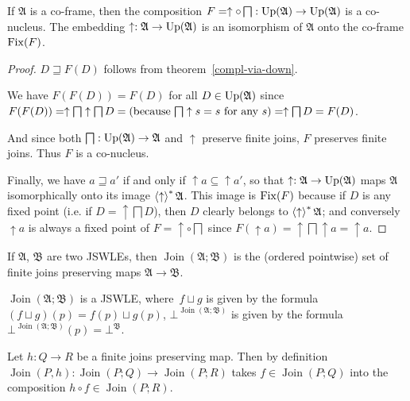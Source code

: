 \begin{cor}
\label{down-meet-co-nucleus}If $\mathfrak{A}$ is a co-frame, then
the composition $F=\uparrow\circ\bigsqcap:\operatorname{Up}(\mathfrak{A})\rightarrow\operatorname{Up}(\mathfrak{A})$
is a co-nucleus. The embedding $\uparrow:\mathfrak{A}\rightarrow\operatorname{Up}(\mathfrak{A})$
is an isomorphism of $\mathfrak{A}$ onto the co-frame $\operatorname{Fix}(F)$.\end{cor}
\begin{proof}
$D\sqsupseteq F(D)$ follows from theorem~\ref{compl-via-down}.

We have $F(F(D))=F(D)$ for all $D\in\operatorname{Up}(\mathfrak{A})$ since
$F(F(D))=\uparrow\bigsqcap\uparrow\bigsqcap D=\text{(because \ensuremath{\bigsqcap\uparrow s=s} for any \ensuremath{s})}=\uparrow\bigsqcap D=F(D)$.

And since both $\bigsqcap:\operatorname{Up}(\mathfrak{A})\rightarrow\mathfrak{A}$
and $\uparrow$ preserve finite joins, $F$ preserves finite joins.
Thus $F$ is a co-nucleus.

Finally, we have $a\sqsupseteq a'$ if and only if $\uparrow a\subseteq\uparrow a'$,
so that $\uparrow:\mathfrak{A}\rightarrow\operatorname{Up}(\mathfrak{A})$ maps
$\mathfrak{A}$ isomorphically onto its image $\left\langle \uparrow\right\rangle ^{\ast}\mathfrak{A}$.
This image is $\operatorname{Fix}(F)$ because if $D$ is any fixed point (i.e.
if $D=\uparrow\bigsqcap D$), then $D$ clearly belongs to $\left\langle \uparrow\right\rangle ^{\ast}\mathfrak{A}$;
and conversely $\uparrow a$ is always a fixed point of $F=\uparrow\circ\bigsqcap$
since $F(\uparrow a)=\uparrow\bigsqcap\uparrow a=\uparrow a$.\end{proof}
\begin{defn}
If $\mathfrak{A}$, $\mathfrak{B}$ are two JSWLEs, then $\operatorname{Join}(\mathfrak{A};\mathfrak{B})$
is the (ordered pointwise) set of finite joins preserving maps $\mathfrak{A}\rightarrow\mathfrak{B}$.\end{defn}
\begin{obvious}
$\operatorname{Join}(\mathfrak{A};\mathfrak{B})$ is a JSWLE, where~$f\sqcup g$
is given by the formula $(f\sqcup g)(p)=f(p)\sqcup g(p)$, $\bot^{\operatorname{Join}(\mathfrak{A};\mathfrak{B})}$
is given by the formula $\bot^{\operatorname{Join}(\mathfrak{A};\mathfrak{B})}(p)=\bot^{\mathfrak{B}}$.\end{obvious}
\begin{defn}
Let $h:Q\rightarrow R$ be a finite joins preserving map. Then by
definition $\operatorname{Join}(P,h):\operatorname{Join}(P;Q)\rightarrow\operatorname{Join}(P;R)$
takes $f\in\operatorname{Join}(P;Q)$ into the composition $h\circ f\in\operatorname{Join}(P;R)$.\end{defn}
